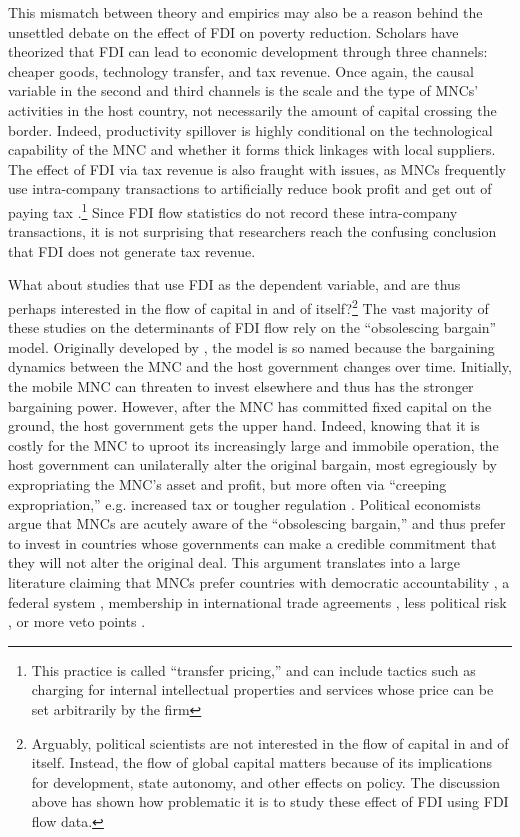 This mismatch between theory and empirics may also be a reason behind the
unsettled debate on the effect of FDI on poverty reduction. Scholars have
theorized that FDI can lead to economic development through three channels:
cheaper goods, technology transfer, and tax revenue. Once again, the causal
variable in the second and third channels is the scale and the type of MNCs'
activities in the host country, not necessarily the amount of capital crossing
the border. Indeed, productivity spillover is highly conditional on the
technological capability of the MNC and whether it forms thick linkages with
local suppliers. The effect of FDI via tax revenue is also fraught with issues,
as MNCs frequently use intra-company transactions to artificially reduce book
profit and get out of paying tax \citep{Malesky2015c}.\footnote{This practice is
  called ``transfer pricing,'' and can include tactics such as charging for
  internal intellectual properties and services whose price can be set
  arbitrarily by the firm} Since FDI flow statistics do not record these
intra-company transactions, it is not surprising that researchers reach the
confusing conclusion that FDI does not generate tax revenue.

What about studies that use FDI as the dependent variable, and are thus perhaps
interested in the flow of capital in and of itself?\footnote{Arguably, political
  scientists are not interested in the flow of capital in and of itself.
  Instead, the flow of global capital matters because of its implications for
  development, state autonomy, and other effects on policy. The discussion above
  has shown how problematic it is to study these effect of FDI using FDI flow
  data.} The vast majority of these studies on the determinants of FDI flow rely
on the ``obsolescing bargain'' model. Originally developed by
\citet{Vernon1971}, the model is so named because the bargaining dynamics
between the MNC and the host government changes over time. Initially, the mobile
MNC can threaten to invest elsewhere and thus has the stronger bargaining power.
However, after the MNC has committed fixed capital on the ground, the host
government gets the upper hand. Indeed, knowing that it is costly for the MNC to
uproot its increasingly large and immobile operation, the host government can
unilaterally alter the original bargain, most egregiously by expropriating the
MNC's asset and profit, but more often via ``creeping expropriation,'' e.g.
increased tax or tougher regulation \citep{Li2009a}. Political economists argue
that MNCs are acutely aware of the ``obsolescing bargain,'' and thus prefer to
invest in countries whose governments can make a credible commitment that they
will not alter the original deal. This argument translates into a large
literature claiming that MNCs prefer countries with democratic accountability
\citep{Jensen2003}, a federal system \citep{Jensen2005}, membership in
international trade agreements \citep{Buthe2008}, less political risk
\citep{Graham2010}, or more veto points \citep{Choi2008}.

